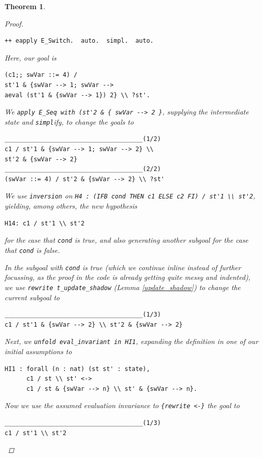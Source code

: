 \documentclass[12pt,notitlepage]{report}
\theoremstyle{plain}
\newtheorem{theo}{Theorem}[section]
\theoremstyle{definition}
\numberwithin{equation}{section}
\begin{document}
\begin{theo}
\begin{proof}
\begin{itemize}
\begin{itemize}
\begin{verbatim}
++ eapply E_Switch.  auto.  simpl.  auto.
\end{verbatim}
Here, our goal is
\begin{verbatim}
(c1;; swVar ::= 4) /
st'1 & {swVar --> 1; swVar -->
aeval (st'1 & {swVar --> 1}) 2} \\ ?st'.
\end{verbatim}
We \verb$apply E_Seq with (st'2 & { swVar --> 2 }$, supplying the intermediate state and \verb$simpl$ify, to change the goals to
\begin{verbatim}
______________________________________(1/2)
c1 / st'1 & {swVar --> 1; swVar --> 2} \\
st'2 & {swVar --> 2}
______________________________________(2/2)
(swVar ::= 4) / st'2 & {swVar --> 2} \\ ?st'
\end{verbatim}
We use \verb$inversion$ on \verb$H4 : (IFB cond THEN c1 ELSE c2 FI) / st'1 \\ st'2$, yielding, among others, the new hypothesis
\begin{verbatim}H14: c1 / st'1 \\ st'2\end{verbatim} for the case that \verb$cond$ is true, and also generating another subgoal for the case that \verb$cond$ is false.
\par In the subgoal with \verb$cond$ is true (which we continue inline instead of further focussing, as the proof in the code is already getting quite messy and indented), we use \verb$rewrite t_update_shadow$ (Lemma \ref{update_shadow}) to change the current subgoal to
\begin{verbatim}
______________________________________(1/3)
c1 / st'1 & {swVar --> 2} \\ st'2 & {swVar --> 2}
\end{verbatim}
Next, we \verb$unfold eval_invariant in HI1$, expanding the definition in one of our initial assumptions to
\begin{verbatim}
HI1 : forall (n : nat) (st st' : state),
      c1 / st \\ st' <->
      c1 / st & {swVar --> n} \\ st' & {swVar --> n}.
\end{verbatim}
Now we use the assumed evaluation invariance to \verb${rewrite <-}$ the goal to
\begin{verbatim}
______________________________________(1/3)
c1 / st'1 \\ st'2

\end{verbatim}
\end{itemize}
\end{itemize}
\end{proof}
\end{theo}
\end{document}
